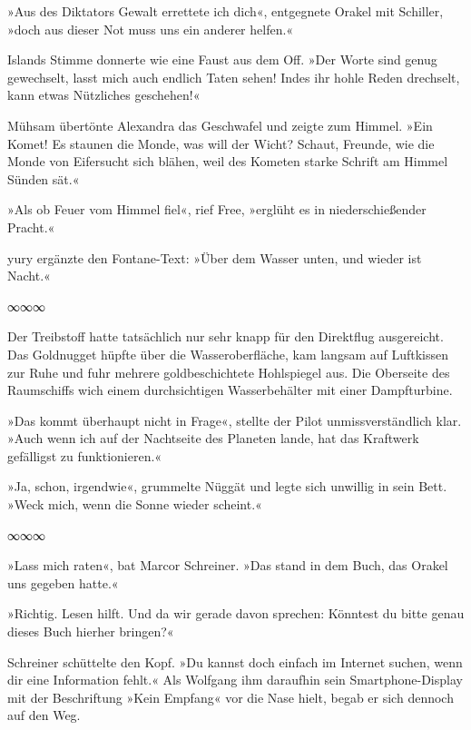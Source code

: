 »Aus des Diktators Gewalt errettete ich dich«, entgegnete Orakel mit Schiller, »doch aus dieser Not muss uns ein anderer helfen.«

Islands Stimme donnerte wie eine Faust aus dem Off. »Der Worte sind genug gewechselt, lasst mich auch endlich Taten sehen! Indes ihr hohle Reden drechselt, kann etwas Nützliches geschehen!«

Mühsam übertönte Alexandra das Geschwafel und zeigte zum Himmel. »Ein Komet! Es staunen die Monde, was will der Wicht? Schaut, Freunde, wie die Monde von Eifersucht sich blähen, weil des Kometen starke Schrift am Himmel Sünden sät.«

»Als ob Feuer vom Himmel fiel«, rief Free, »erglüht es in niederschießender Pracht.«

yury ergänzte den Fontane-Text: »Über dem Wasser unten, und wieder ist Nacht.«

\begin{center}
∞∞∞
\end{center}

Der Treibstoff hatte tatsächlich nur sehr knapp für den Direktflug ausgereicht. Das Goldnugget hüpfte über die Wasseroberfläche, kam langsam auf Luftkissen zur Ruhe und fuhr mehrere goldbeschichtete Hohlspiegel aus. Die Oberseite des Raumschiffs wich einem durchsichtigen Wasserbehälter mit einer Dampfturbine.


»Das kommt überhaupt nicht in Frage«, stellte der Pilot unmissverständlich klar. »Auch wenn ich auf der Nachtseite des Planeten lande, hat das Kraftwerk gefälligst zu funktionieren.«


»Ja, schon, irgendwie«, grummelte Nüggät und legte sich unwillig in sein Bett. »Weck mich, wenn die Sonne wieder scheint.«

\begin{center}
∞∞∞
\end{center}

»Lass mich raten«, bat Marcor Schreiner. »Das stand in dem Buch, das Orakel uns gegeben hatte.«

»Richtig. Lesen hilft. Und da wir gerade davon sprechen: Könntest du bitte genau dieses Buch hierher bringen?«

Schreiner schüttelte den Kopf. »Du kannst doch einfach im Internet suchen, wenn dir eine Information fehlt.« Als Wolfgang ihm daraufhin sein Smartphone-Display mit der Beschriftung »Kein Empfang« vor die Nase hielt, begab er sich dennoch auf den Weg.

